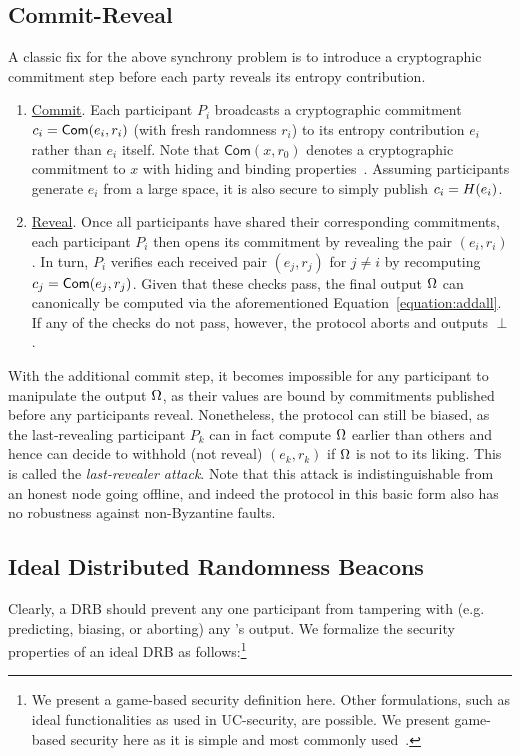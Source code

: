 \subsection{Commit-Reveal}
\label{subsection:commit-reveal}
A classic fix for the above synchrony problem is to introduce a cryptographic commitment step before each party reveals its entropy contribution.
\begin{enumerate}
\item \underline{Commit}. Each participant $P_i$ broadcasts a cryptographic commitment $c_i = \mathsf{Com}(e_i, r_i)$ (with fresh randomness $r_i$) to its entropy contribution $e_i$ rather than $e_i$ itself. Note that $\mathsf{Com}(x, r_0)$ denotes a cryptographic commitment to $x$ with hiding and binding properties~\cite{blum1983coin,damgaard1998commitment}. Assuming participants generate $e_i$ from a large space, it is also secure to simply publish $c_i = H(e_i)$.
\item \underline{Reveal}. Once all participants have shared their corresponding commitments, each participant $P_i$ then opens its commitment by revealing the pair $(e_i, r_i)$. In turn, $P_i$ verifies each received pair $(e_j, r_j)$ for $j \neq i$ by recomputing $c_j = \mathsf{Com}(e_j, r_j)$. Given that these checks pass, the final output $\Omega$ can canonically be computed via the aforementioned Equation~\ref{equation:addall}. If any of the checks do not pass, however, the protocol aborts and outputs $\perp$.
\end{enumerate}

With the additional commit step, it becomes impossible for any participant to manipulate the output $\Omega$, as their values are bound by commitments published before any participants reveal. Nonetheless, the protocol can still be biased, as the last-revealing participant $P_k$ can in fact compute $\Omega$ earlier than others and hence can decide to withhold (not reveal) $(e_k, r_k)$ if $\Omega$ is not to its liking. This is called the \textit{last-revealer attack}. Note that this attack is indistinguishable from an honest node going offline, and indeed the protocol in this basic form also has no robustness against non-Byzantine faults.

\subsection{Ideal Distributed Randomness Beacons}
Clearly, a DRB should prevent any one participant from tampering with (e.g. predicting, biasing, or aborting) any \epoch's output. %
We formalize the security properties of an ideal DRB as follows:\footnote{We present a game-based security definition here. Other formulations, such as ideal functionalities as used in UC-security, are possible. We present game-based security here as it is simple and most commonly used~.}

